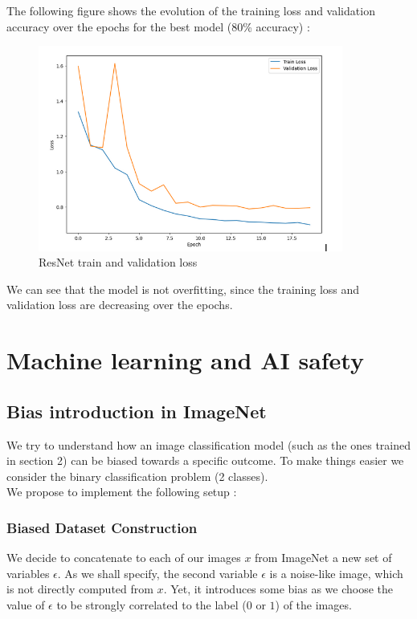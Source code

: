 \documentclass[12pt,a4paper]{article}
\begin{document}
The following figure shows the evolution of the training loss and validation accuracy over the epochs for the best model (80\% accuracy) :

\begin{figure}[ht]
    \centering
    \includegraphics[width=10cm]{src/Resnet1.png}
    \caption{ResNet train and validation loss}
\end{figure}

We can see that the model is not overfitting, since the training loss and validation loss are decreasing over the epochs.


\section{Machine learning and AI safety}

\subsection{Bias introduction in ImageNet}

We try to understand how an image classification model (such as the ones trained in section 2) can be biased towards a specific outcome.
To make things easier we consider the binary classification problem (2 classes). \\
We propose to implement the following setup :


\subsubsection{Biased Dataset Construction}

We decide to concatenate to each of our images $x$ from ImageNet a new set of variables $\epsilon$.
As we shall specify, the second variable $\epsilon$ is a noise-like image, which is not directly computed from $x$.
Yet, it introduces some bias as we choose the value of $\epsilon$ to be strongly correlated to the label ($0$ or $1$) of the images.\\
\end{document}
